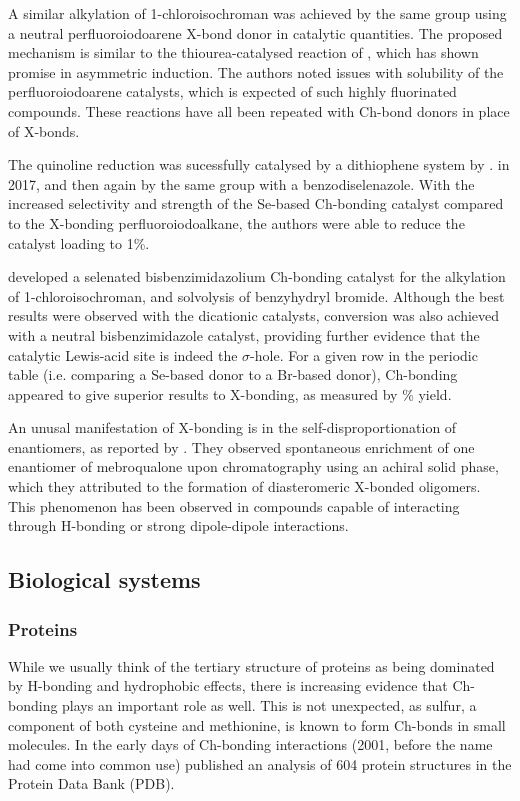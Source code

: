 \begin{refsection}
A similar alkylation of 1-chloroisochroman was achieved by the same group using a neutral perfluoroiodoarene X-bond donor in catalytic quantities.\autocite{Kniep2013}
The proposed mechanism is similar to the thiourea-catalysed reaction of \citeauthor{Reisman2008}\autocite{Reisman2008}, which has shown promise in asymmetric induction.
The authors noted issues with solubility of the perfluoroiodoarene catalysts, which is expected of such highly fluorinated compounds.
These reactions have all been repeated with Ch-bond donors in place of X-bonds.

The quinoline reduction was sucessfully catalysed by a dithiophene system by \citeauthor{Benz2017}. in 2017\autocite{Benz2017}, and then again by the same group with a benzodiselenazole.\autocite{Benz2017a}
With the increased selectivity and strength of the Se-based Ch-bonding catalyst compared to the X-bonding perfluoroiodoalkane, the authors were able to reduce the catalyst loading to 1\%.

\citeauthor{Wonner2017} developed a selenated bisbenzimidazolium Ch-bonding catalyst for the alkylation of 1-chloroisochroman, and solvolysis of benzyhydryl bromide.\autocite{Wonner2017,Wonner2017a}
Although the best results were observed with the dicationic catalysts, conversion was also achieved with a neutral bisbenzimidazole catalyst, providing further evidence that the catalytic Lewis-acid site is indeed the $\sigma$-hole.
For a given row in the periodic table (i.e. comparing a Se-based donor to a Br-based donor), Ch-bonding appeared to give superior results to X-bonding, as measured by \% yield.

An unusal manifestation of X-bonding is in the self-disproportionation of enantiomers, as reported by \citeauthor{Soloshonok2017}.\autocite{Soloshonok2017}
They observed spontaneous enrichment of one enantiomer of mebroqualone upon chromatography using an achiral solid phase, which they attributed to the formation of diasteromeric X-bonded oligomers.
This phenomenon has been observed in compounds capable of interacting through H-bonding or strong dipole-dipole interactions.

\subsection{Biological systems}

\subsubsection{Proteins}
While we usually think of the tertiary structure of proteins as being dominated by H-bonding and hydrophobic effects, there is increasing evidence that Ch-bonding plays an important role as well.
This is not unexpected, as sulfur, a component of both cysteine and methionine, is known to form Ch-bonds in small molecules.
In the early days of Ch-bonding interactions (2001, before the name had come into common use) \citeauthor{Iwaoka2001} published an analysis of 604 protein structures in the Protein Data Bank (PDB).\autocite{Iwaoka2001}


\end{refsection}
